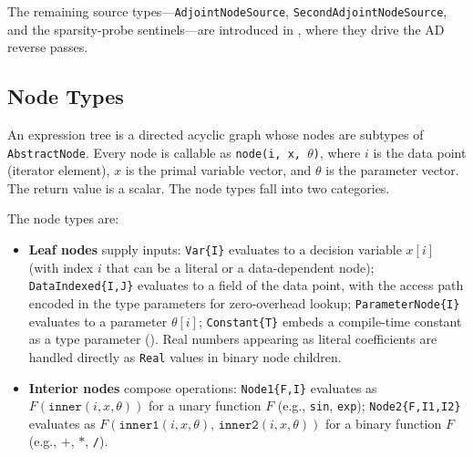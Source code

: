 \documentclass[11pt]{article}
\begin{document}
The remaining source types---\texttt{AdjointNodeSource}, \texttt{SecondAdjointNodeSource}, and the sparsity-probe sentinels---are introduced in , where they drive the AD reverse passes.

\subsection{Node Types}
\label{sec:graph:nodes}

An expression tree is a directed acyclic graph whose nodes are subtypes of \texttt{AbstractNode}. Every node is callable as \texttt{node(i, x, $\theta$)}, where $i$ is the data point (iterator element), $x$ is the primal variable vector, and $\theta$ is the parameter vector. The return value is a scalar. The node types fall into two categories.

The node types are:
\begin{itemize}
  \item \textbf{Leaf nodes} supply inputs:
    \texttt{Var\{I\}} evaluates to a decision variable $x[i]$ (with index $i$ that can be a literal or a data-dependent node);
    \texttt{DataIndexed\{I,J\}} evaluates to a field of the data point, with the access path encoded in the type parameters for zero-overhead lookup;
    \texttt{ParameterNode\{I\}} evaluates to a parameter $\theta[i]$;
    \texttt{Constant\{T\}} embeds a compile-time constant as a type parameter ().
    Real numbers appearing as literal coefficients are handled directly as \texttt{Real} values in binary node children.
  \item \textbf{Interior nodes} compose operations:
    \texttt{Node1\{F,I\}} evaluates as $F(\texttt{inner}(i, x, \theta))$ for a unary function $F$ (e.g., \texttt{sin}, \texttt{exp});
    \texttt{Node2\{F,I1,I2\}} evaluates as $F(\texttt{inner1}(i, x, \theta),\, \texttt{inner2}(i, x, \theta))$ for a binary function $F$ (e.g., $+$, $*$, \texttt{/}).
\end{itemize}
\end{document}
